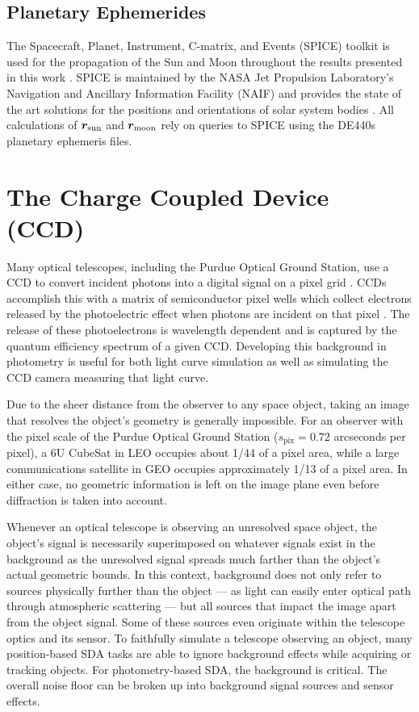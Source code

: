 \subsection{Planetary Ephemerides} \label{sec:planet_ephem}

The Spacecraft, Planet, Instrument, C-matrix, and Events (SPICE) toolkit is used for the propagation of the Sun and Moon throughout the results presented in this work \cite{spice}. SPICE is maintained by the NASA Jet Propulsion Laboratory's Navigation and Ancillary Information Facility (NAIF) and provides the state of the art solutions for the positions and orientations of solar system bodies \cite{spice}. All calculations of $\bm{r}_\mathrm{sun}$ and $\bm{r}_\mathrm{moon}$ rely on queries to SPICE using the DE440s planetary ephemeris files.

\section{The Charge Coupled Device (CCD)} \label{sec:ccd_performance}

Many optical telescopes, including the Purdue Optical Ground Station, use a CCD to convert incident photons into a digital signal on a pixel grid \cite{krag2003}. CCDs accomplish this with a matrix of semiconductor pixel wells which collect electrons released by the photoelectric effect when photons are incident on that pixel \cite{krag2003}. The release of these photoelectrons is wavelength dependent and is captured by the quantum efficiency spectrum of a given CCD. Developing this background in photometry is useful for both light curve simulation as well as simulating the CCD camera measuring that light curve. 

Due to the sheer distance from the observer to any space object, taking an image that resolves the object's geometry is generally impossible. For an observer with the pixel scale of the Purdue Optical Ground Station ($s_\mathrm{pix} = 0.72$ arcseconds per pixel), a 6U CubeSat in LEO occupies about 1/44 of a pixel area, while a large communications satellite in GEO occupies approximately 1/13 of a pixel area. In either case, no geometric information is left on the image plane even before diffraction is taken into account. 

Whenever an optical telescope is observing an unresolved space object, the object's signal is necessarily superimposed on whatever signals exist in the background as the unresolved signal spreads much farther than the object's actual geometric bounds. In this context, background does not only refer to sources physically further than the object --- as light can easily enter optical path through atmospheric scattering --- but all sources that impact the image apart from the object signal. Some of these sources even originate within the telescope optics and its sensor. To faithfully simulate a telescope observing an object, many position-based SDA tasks are able to ignore background effects while acquiring or tracking objects. For photometry-based SDA, the background is critical. The overall noise floor can be broken up into background signal sources and sensor effects.

